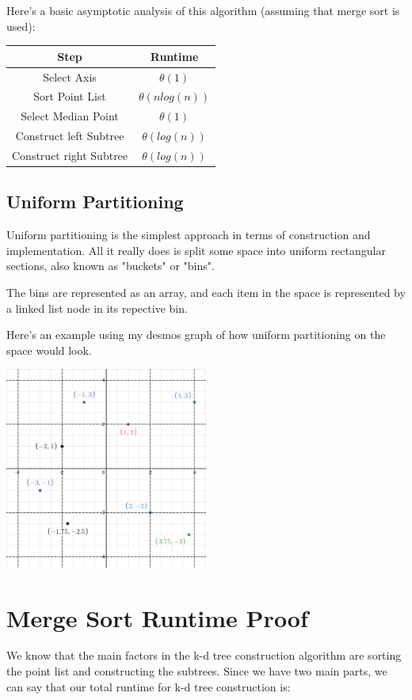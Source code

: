 \documentclass{article}
\begin{document}
\begin{multicols}{2}
Here's a basic asymptotic analysis of this algorithm (assuming that merge sort is used):
\begin{tabular}{ c | c }
  Step & Runtime \\
  \hline
  Select Axis & $\theta(1)$ \\
  Sort Point List & $\theta(n log(n))$ \\
  Select Median Point & $\theta(1)$ \\
  Construct left Subtree & $\theta(log(n))$ \\
  Construct right Subtree & $\theta(log(n))$
\end{tabular}
\end{multicols}

\subsection{Uniform Partitioning}
Uniform partitioning is the simplest approach in terms of construction and implementation. All it really does is split some space into
uniform rectangular sections, also known as "buckets" or "bins".

The bins are represented as an array, and each item in the space is represented by a linked list node in its repective bin.

Here's an example using my desmos graph of how uniform partitioning on the space would look.

\begin{center}
  \includegraphics[width=0.5\textwidth]{desmos-uniform}
\end{center}

\section{Merge Sort Runtime Proof}
We know that the main factors in the k-d tree construction algorithm are sorting the point list and constructing the subtrees.
Since we have two main parts, we can say that our total runtime for k-d tree construction is:
\end{document}
